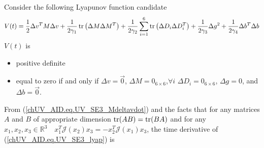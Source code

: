 Consider the following Lyapunov function candidate
\begin{equation}
\label{chUV_AID.eq.UV_SE3_lyap}
V(t)=\frac{1}{2}\Delta v^{T} M \Delta v  
      +\frac{1}{2\gamma_1}\tr\left(\Delta M \Delta M^{T}\right) %
     +\frac{1}{2\gamma_2}\sum_{i=1}^6\tr\left(\Delta D_i \Delta D_i^{T}\right)
     +\frac{1}{2\gamma_3}\Delta g^2    
     +\frac{1}{2\gamma_4}\Delta b^T \Delta b 
\end{equation}
%
\noindent $V(t)$ is
%
\begin{itemize}
\item positive definite
\item equal to zero if and only if $\Delta v=\vec{0}$, $\Delta
  M=0_{6\times 6}$,$\forall i$ $\Delta D_i=0_{6\times 6}$, $\Delta
  g=0$, and $\Delta b=\vec{0}$.
\end{itemize}
%
\noindent From (\ref{chUV_AID.eq.UV_SE3_Mdeltavdot}) and the facts
that for any matrices $A$ and $B$ of appropriate dimension
$\operatorname{tr}(AB)=\operatorname{tr}(BA)$ and for any $x_1,x_2,x_3\in\mathbb{R}^3 \quad
x_1^T\mathcal{J}(x_2)x_3=-x_2^T\mathcal{J}(x_1)x_3$, the time
derivative of (\ref{chUV_AID.eq.UV_SE3_lyap}) is

